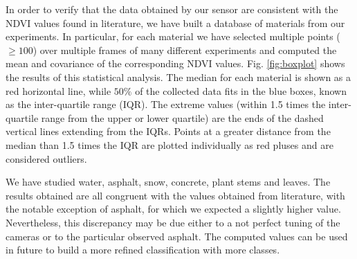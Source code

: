 \documentclass[letterpaper, 10pt, conference]{ieeeconf}      %
\newcommand{\paolo}[1]{{\textcolor{red}{#1}}}
\begin{document}
In order to verify that the data obtained by our sensor are consistent with the NDVI values found in literature, we have built a database of materials from our experiments.
In particular, for each material we have selected multiple points ($\geq 100$) over multiple frames of many different  experiments and computed the mean and covariance of the corresponding NDVI values.
Fig. \ref{fig:boxplot} shows the results of this statistical analysis. 
The median for each material is shown as a red horizontal line, while $50\%$ of the collected data fits in the blue boxes, known as the inter-quartile range (IQR).
The extreme values (within 1.5 times the inter-quartile range from the upper or lower quartile) are the ends of the dashed vertical lines extending from the IQRs.
Points at a greater distance from the median than 1.5 times the IQR are plotted individually as red pluses and are considered outliers.



We have studied water, asphalt, snow, concrete, plant stems and leaves. 
The results obtained are all congruent with the values obtained from literature, with the notable exception of asphalt, for which we expected a  slightly higher value.
Nevertheless, this discrepancy may be due  either to a not perfect tuning of the cameras or to the particular observed asphalt.
The computed values can be used in future to build a more refined classification with more classes.
\end{document}
